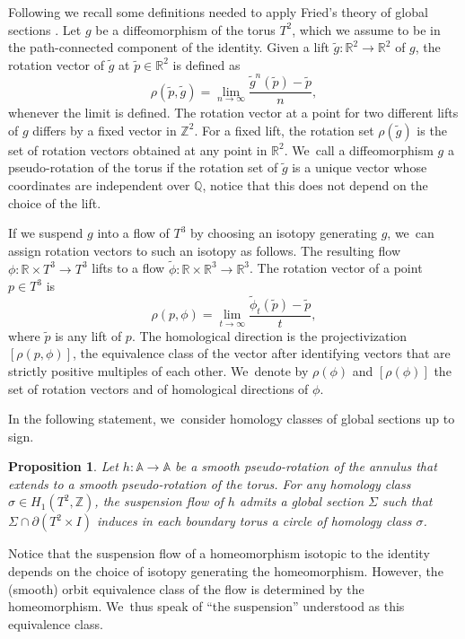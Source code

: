 \documentclass[10pt]{amsart}
\newtheorem{prop}[theorem]{Proposition}
\theoremstyle{definition}
\begin{document}
Following \cite{K1} we recall some definitions needed to apply Fried's theory of global sections \cite{Fr}. Let $g$ be a diffeomorphism of the torus $T^2$, which we assume to be in the path-connected component of the identity. Given a lift $\widetilde g:\mathbb{R}^2 \rightarrow \mathbb{R}^2$ of $g$, the rotation vector of $\widetilde g$ at $\widetilde p \in \mathbb{R}^2$ is defined as
\[
\rho(\widetilde p, \widetilde g)=\lim_{n\rightarrow \infty} \frac{\widetilde g^n(\widetilde p)-\widetilde p}{n},
\]
whenever the limit is defined. The rotation vector at a point for two different lifts of $g$ differs by a fixed vector in $\mathbb{Z}^2$. For a fixed lift, the rotation set $\rho(\widetilde g)$ is the set of rotation vectors obtained at any point in $\mathbb{R}^2$. We~call a diffeomorphism $g$ a pseudo-rotation of the torus if the rotation set of $\widetilde g$ is a unique vector whose coordinates are independent over $\mathbb{Q}$, notice that this does not depend on the choice of the lift.

If we suspend $g$ into a flow of $T^3$ by choosing an isotopy generating $g$, we~can assign rotation vectors to such an isotopy as follows. The resulting flow $\phi: \mathbb{R}\times T^3\rightarrow T^3$ lifts to a flow $\widetilde \phi: \mathbb{R}\times \mathbb{R}^3\rightarrow \mathbb{R}^3$. The rotation vector of a point $p\in T^3$ is
\[
\rho(p,\phi)=\lim_{t\rightarrow \infty}\frac{\widetilde \phi_t(\widetilde p)-\widetilde p}{t},
\]
where $\widetilde p$ is any lift of $p$. The homological direction is the projectivization $[\rho(p,\phi)]$, \ie the equivalence class of the vector after identifying vectors that are strictly positive multiples of each other. We~denote by $\rho(\phi)$ and $[\rho(\phi)]$ the set of rotation vectors and of homological directions of $\phi$.

In the following statement, we~consider homology classes of global sections up to sign.
\begin{prop}\label{prop:sections}
Let $h: \mathbb{A} \rightarrow \mathbb{A}$ be a smooth pseudo-rotation of the annulus that extends to a smooth pseudo-rotation of the torus. For any homology class $\sigma\in H_1(T^2,\mathbb{Z})$, the suspension flow of $h$ admits a global section $\Sigma$ such that $ \Sigma \cap \partial (T^2\times I)$ induces in each boundary torus a circle of homology class $\sigma$.
\end{prop}

Notice that the suspension flow of a homeomorphism isotopic to the identity depends on the choice of isotopy generating the homeomorphism. However, the (smooth) orbit equivalence class of the flow is determined by the homeomorphism. We~thus speak of ``the suspension'' understood as this equivalence class.
\end{document}
